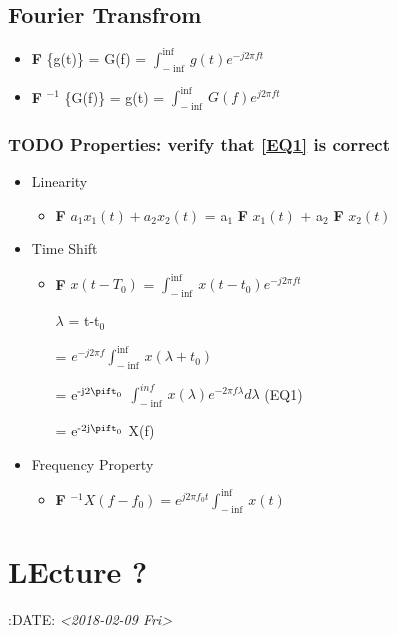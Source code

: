 \documentclass[11pt]{article}
\begin{document}
\subsection{Fourier Transfrom}
\label{sec-5-4}

\begin{itemize}
\item \textbf{F} \{g(t)\} = G(f) = $\int_{-\inf}^{\inf} g(t) e^{-j2\pi ft}$

\item \textbf{F} $^{-1}$ \{G(f)\} = g(t) = $\int_{-\inf}^{\inf} G(f) e^{j2\pi ft}$
\end{itemize}


\subsubsection{{\bfseries\sffamily TODO} Properties: verify that \ref{EQ1} is correct}
\label{sec-5-4-1}
\begin{itemize}
\item Linearity
\begin{itemize}
\item \textbf{F} ${a_1 x_1(t) + a_2 x_2(t)}$ = a$_{\text{1}}$ \textbf{F} ${x_1(t)}$ + a$_{\text{2}}$ \textbf{F} ${x_2(t)}$
\end{itemize}
\item Time Shift
\begin{itemize}
\item \textbf{F} ${x(t - T_0)}$ = $\int_{-\inf}^{\inf} x(t-t_0) e^{-j2\pi ft}$

$\lambda$ = t-t$_{\text{0}}$

= $e^{-j2\pi f}\int_{-\inf}^{\inf}{x(\lambda +t_0)}$

= e$^{\text{-j2}\pift_{\text{0}}}$ $\int_{-\inf}^{inf} x(\lambda) e^{-2\pi f\lambda} d\lambda$ \label{EQ1} (EQ1)

= e$^{\text{-2j}\pift_{\text{0}}}$ X(f)
\end{itemize}

\item Frequency Property
\begin{itemize}
\item \textbf{F} $^{-1}{X(f-f_0)} = e^{j2\pi f_0t} \int_{-\inf}^{\inf}{x(t)}$
\end{itemize}
\end{itemize}

\section{LEcture ?}
\label{sec-6}
:DATE: \textit{<2018-02-09 Fri>}
\end{document}

